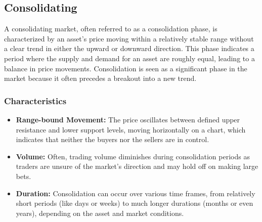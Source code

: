 \documentclass{report}
\begin{document}
    \bigbreak \noindent 












    \bigbreak \noindent 
    \subsection{Consolidating}
    \bigbreak \noindent 
    A consolidating market, often referred to as a consolidation phase, is characterized by an asset's price moving within a relatively stable range without a clear trend in either the upward or downward direction. This phase indicates a period where the supply and demand for an asset are roughly equal, leading to a balance in price movements. Consolidation is seen as a significant phase in the market because it often precedes a breakout into a new trend.
    \bigbreak \noindent 
    \subsubsection{Characteristics}
    \bigbreak \noindent 
    \begin{itemize}
        \item \textbf{Range-bound Movement:} The price oscillates between defined upper resistance and lower support levels, moving horizontally on a chart, which indicates that neither the buyers nor the sellers are in control.
        \item \textbf{Volume:} Often, trading volume diminishes during consolidation periods as traders are unsure of the market's direction and may hold off on making large bets.
        \item \textbf{Duration:} Consolidation can occur over various time frames, from relatively short periods (like days or weeks) to much longer durations (months or even years), depending on the asset and market conditions.
    \end{itemize}




    
\end{document}
